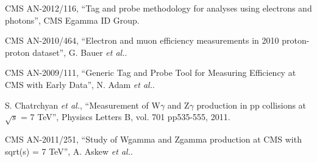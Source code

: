 \clearpage

\vspace*{-0.2cm}

 CMS AN-2012/116, ``Tag and probe methodology for analyses using electrons and photons'',
CMS Egamma ID Group.

 CMS AN-2010/464, ``Electron and muon efficiency measurements in 2010 proton-proton dataset'',
G. Bauer \textit{et al.}.

 CMS AN-2009/111, ``Generic Tag and Probe Tool for Measuring Efficiency at CMS with Early Data'',
N. Adam \textit{et al.}.

S. Chatrchyan \textit{et al.}, ``Measurement of W$\gamma$ and Z$\gamma$ production in pp collisions at $\sqrt{s}$ = 7 TeV'', Physiscs Letters B, vol. 701 pp535-555, 2011.

CMS AN-2011/251, ``Study of Wgamma and Zgamma production at CMS with sqrt(s) = 7 TeV'', 
A. Askew \textit{et al.}.